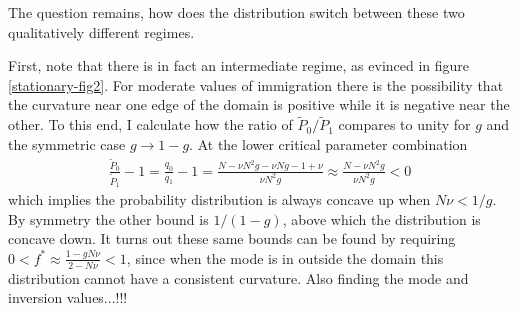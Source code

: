 The question remains, how does the distribution switch between these two qualitatively different regimes. 
\iffalse
To observe this I calculate the curvature of the extremum point. 
It goes from positive to negative as the immigration rate is increased, and there must be a critical value at which it changes sign. 
This is found when $\partial_n^2 q_n=0$. 
I note that $\partial_n^2 q_n=\partial_n \big(q_n \partial_n \ln[q_n] \big) = q_n \big( (\partial_n \ln[q_n])^2 + \partial_n^2 \ln[q_n] \big)$. 
$q_n>0$ and $\partial_n \ln[q_n]=0$ at the extremum so an equivalent problem is to find the parameter values that make $\partial_n^2 \ln[q_n]=0$ at the extremum. 
\begin{align*}
 \partial_n^2 \ln[q_n] &= \frac{\gamma}{f-1} + \frac{\gamma}{f-\gamma+\epsilon g} + \frac{\gamma}{\gamma-f} + \frac{\gamma}{1-f+\epsilon(1-g)} + \frac{2\gamma^2}{f\big(1-f+\epsilon(1-g)\big)} + \frac{\gamma^2\big(2f-1-\epsilon(1-g)\big)}{f\big(1-f+\epsilon(1-g)\big)^2} + \frac{\gamma^2\big(1-2f+\epsilon(1-g)\big)}{f^2\big(1-f+\epsilon(1-g)\big)}
\end{align*}
Substituting $f^*$ and expanding to lowest order makes the sign proportional to
\begin{equation*}
 4 - 2\epsilon/\gamma - \big(1-4g(1-g)\big)\big(\epsilon/\gamma\big)^2
\end{equation*}
\fi
First, note that there is in fact an intermediate regime, as evinced in figure \ref{stationary-fig2}. 
For moderate values of immigration there is the possibility that the curvature near one edge of the domain is positive while it is negative near the other. 
To this end, I calculate how the ratio of $\widetilde{P}_0/\widetilde{P}_1$ compares to unity for $g$ and the symmetric case $g\rightarrow 1-g$. 
At the lower critical parameter combination
\begin{align*}
 \frac{\widetilde{P}_0}{\widetilde{P}_1} - 1 = \frac{q_0}{q_1} - 1 = \frac{N - \nu N^2 g - \nu N g - 1 + \nu}{\nu N^2 g} \approx \frac{N - \nu N^2 g}{\nu N^2 g} < 0
\end{align*}
which implies the probability distribution is always concave up when $N\nu < 1/g$. %
By symmetry the other bound is $1/(1-g)$, above which the distribution is concave down. 
It turns out these same bounds can be found by requiring $0<f^*\approx\frac{1-g N\nu}{2-N\nu}<1$, since when the mode is in outside the domain this distribution cannot have a consistent curvature. 
Also finding the mode and inversion values...!!!

